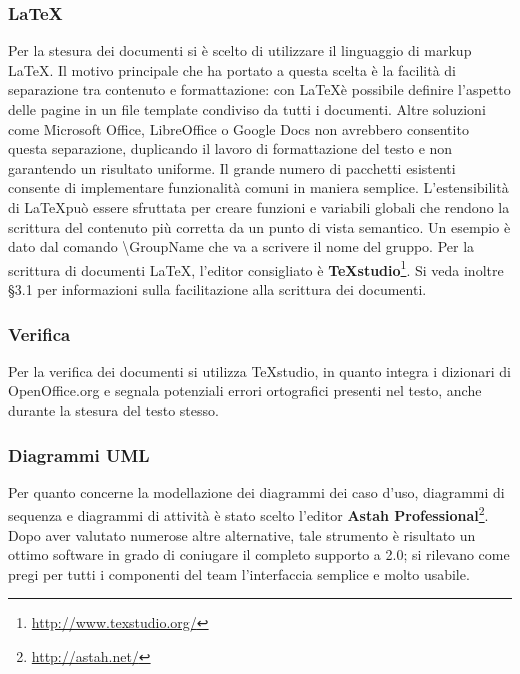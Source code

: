 \subsubsection{\LaTeX}
Per la stesura dei documenti si è scelto di utilizzare il linguaggio di markup \LaTeX. Il motivo principale che ha portato a questa scelta è la facilità di separazione tra contenuto e formattazione: con \LaTeX è possibile definire l'aspetto delle pagine in un file template condiviso da tutti i documenti. Altre soluzioni come Microsoft Office, LibreOffice o Google Docs non avrebbero consentito questa separazione, duplicando il lavoro di formattazione del testo e non garantendo un risultato uniforme. Il grande numero di pacchetti esistenti consente di implementare funzionalità comuni in maniera semplice. L'estensibilità di \LaTeX può essere sfruttata per creare funzioni e variabili globali che rendono la scrittura del contenuto più corretta da un punto di
vista semantico. Un esempio è dato dal comando \textbackslash GroupName che va a scrivere il nome del gruppo. Per la scrittura di documenti \LaTeX, l'editor consigliato è \textbf{TeXstudio}\footnote[2]{\url{http://www.texstudio.org/}}. Si veda inoltre §3.1 per informazioni sulla facilitazione alla scrittura dei documenti.

\subsubsection{Verifica}
Per la verifica dei documenti si utilizza TeXstudio, in quanto integra i dizionari di OpenOffice.org e segnala potenziali errori ortografici presenti nel testo, anche durante la stesura del testo stesso.

\subsubsection{Diagrammi UML}

Per quanto concerne la modellazione dei diagrammi dei caso d'uso, diagrammi di sequenza e diagrammi di attività è stato scelto l'editor \textbf{Astah Professional}\footnote[3]{\url{http://astah.net/}}. Dopo aver valutato numerose altre alternative, tale strumento è risultato un ottimo software in grado di coniugare il completo supporto a  2.0; si rilevano come pregi per tutti i componenti del team l'interfaccia semplice e molto usabile.

